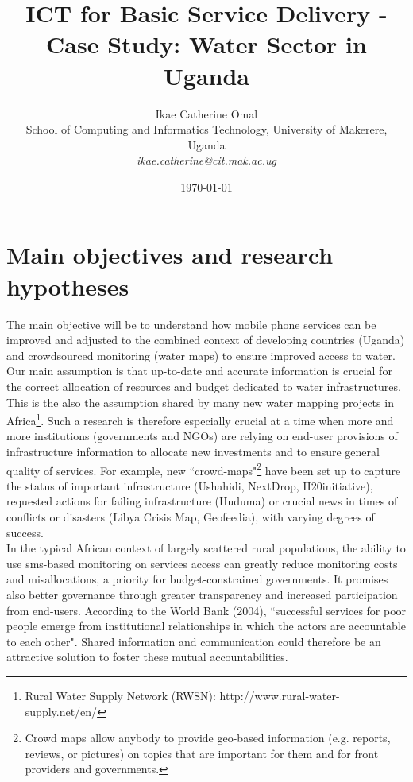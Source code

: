 \documentclass[11pt]{article}
\title{ICT for Basic Service Delivery - Case Study: Water Sector in Uganda}
\author{
\small{Ikae Catherine Omal}\\
\small{School of Computing and Informatics Technology, University of Makerere, Uganda}\\ \small{\textit{ikae.catherine@cit.mak.ac.ug}}\\
}
\date{\today}
\begin{document}
\maketitle

\begin{abstract}

\end{abstract}



\section{Main objectives and research hypotheses}\label{objectives}
The main objective will be to understand how mobile phone services can be improved and adjusted to the combined context of developing countries (Uganda) and crowdsourced monitoring (water maps) to ensure improved access to water. Our main assumption is that up-to-date and accurate information is crucial for the correct allocation of resources and budget dedicated to water infrastructures. This is the also the assumption shared by many new water mapping projects in Africa\footnote{Rural Water Supply Network (RWSN): http://www.rural-water-supply.net/en/}. Such a research is therefore especially crucial at a time when more and more institutions (governments and NGOs) are relying on end-user provisions of infrastructure information to allocate new investments and to ensure general quality of services. For example, new ``crowd-­maps"\footnote{Crowd maps allow anybody to provide geo-­based information (e.g. reports, reviews, or pictures) on topics that are important for them and for front providers and governments.
} have been set up to capture the status of important infrastructure (Ushahidi, NextDrop, H20initiative), requested actions for failing infrastructure (Huduma) or crucial news in times of conflicts or disasters (Libya Crisis Map, Geofeedia), with varying degrees of success. 
\\
In the typical African context of largely scattered rural populations, the ability to use sms-based monitoring on services access can greatly reduce monitoring costs and misallocations, a priority for budget-constrained governments. It promises also better governance through greater transparency and increased participation from end-users. According to the World Bank (2004), ``successful services for poor people emerge from institutional relationships in which the actors are accountable to each other". Shared information and communication could therefore be an attractive solution to foster these mutual accountabilities. 
\end{document}
